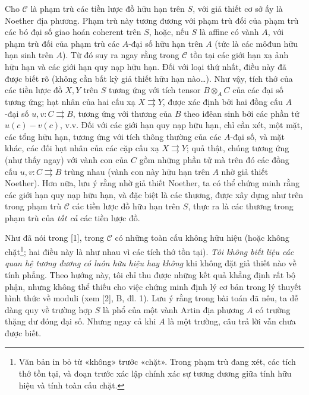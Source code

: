 \documentclass[11pt,twoside,openany]{book}
\numberwithin{equation}{section}
\newcommand{\src}[1]{%
  \phantomsection\hypertarget{src:\fgasourceid:#1}{}%
  \marginpar{\raggedleft\footnotesize\sffamily #1}%
}
\newcommand{\fgasourceid}{unset}
\begin{document}
Cho $\mathcal C$ là phạm trù các tiền lược đồ hữu hạn trên $S$, với giả thiết
cơ sở ấy là Noether địa phương. Phạm trù này tương đương với phạm trù đối của phạm
trù các bó đại số giao hoán coherent trên $S$, hoặc, nếu $S$ là affine có
vành $A$, với phạm trù đối của phạm trù các $A$-đại số hữu hạn trên $A$ (tức
là các môđun hữu hạn sinh trên $A$). Từ đó suy ra ngay rằng trong $\mathcal C$
tồn tại các giới hạn xạ ảnh hữu hạn và các giới hạn quy nạp hữu hạn. Đối với
loại thứ nhất, điều này đã được biết rõ (không cần bất kỳ giả thiết hữu hạn
nào\ldots). Như vậy, tích thớ của các tiền lược đồ $X,Y$ trên $S$ tương ứng
với tích tensor $B\otimes_A C$ của các đại số tương ứng; hạt nhân của hai cấu
xạ $X\rightrightarrows Y$, được xác định bởi hai đồng cấu $A$-đại số
$u,v:C\rightrightarrows B$, tương ứng với thương của $B$ theo iđêan sinh bởi
các phần tử $u(c)-v(c)$, v.v. Đối với các giới hạn quy nạp hữu hạn, chỉ cần
xét, một mặt, các tổng hữu hạn, tương ứng với tích thông thường của các
$A$-đại số, và mặt khác, các đối hạt nhân của các cặp cấu xạ
$X\rightrightarrows Y$; quả thật, chúng tương ứng (như thấy ngay) với vành con
của $C$ gồm những phần tử mà trên đó các đồng cấu
$u,v:C\rightrightarrows B$ trùng nhau (vành con này hữu hạn trên $A$ nhờ giả
thiết Noether). Hơn nữa, lưu ý rằng nhờ giả thiết Noether, ta có thể chứng
minh rằng các giới hạn quy nạp hữu hạn, và đặc biệt là các thương, được xây
dựng như trên trong phạm trù $\mathcal C$ các tiền lược đồ hữu hạn trên $S$,
thực ra là các thương trong phạm trù của \emph{tất cả} các tiền lược đồ.
\src{103}
Như đã nói trong [1], trong $\mathcal C$ có những toàn cấu không hữu hiệu
(hoặc không chặt\footnote{Văn bản in bỏ từ «không» trước «chặt». Trong phạm
trù đang xét, các tích thớ tồn tại, và đoạn trước xác lập chính xác sự tương
đương giữa tính hữu hiệu và tính toàn cấu chặt.}; hai điều này là như nhau vì
các tích thớ tồn tại). \emph{Tôi không biết liệu các quan hệ tương đương có
luôn hữu hiệu hay không} khi không đặt giả thiết nào về tính phẳng. Theo hướng
này, tôi chỉ thu được những kết quả khẳng định rất bộ phận, nhưng không thể
thiếu cho việc chứng minh định lý cơ bản trong lý thuyết hình thức về moduli
(xem [2], B, đl. 1). Lưu ý rằng trong bài toán đã nêu, ta dễ dàng quy về
trường hợp $S$ là phổ của một vành Artin địa phương $A$ có trường thặng dư
đóng đại số. Nhưng ngay cả khi $A$ là một trường, câu trả lời vẫn chưa được
biết.
\end{document}

